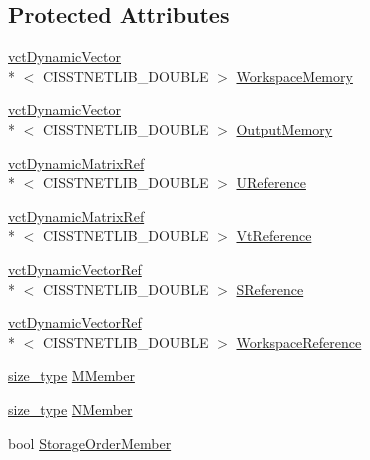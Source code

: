 \subsection*{Protected Attributes}
\begin{DoxyCompactItemize}
\item 
\hyperlink{classvct_dynamic_vector}{vct\-Dynamic\-Vector}\\*
$<$ C\-I\-S\-S\-T\-N\-E\-T\-L\-I\-B\-\_\-\-D\-O\-U\-B\-L\-E $>$ \hyperlink{classnmr_s_v_d_dynamic_data_abe50251589c5f7d24ae6d2024f7344f0}{Workspace\-Memory}
\item 
\hyperlink{classvct_dynamic_vector}{vct\-Dynamic\-Vector}\\*
$<$ C\-I\-S\-S\-T\-N\-E\-T\-L\-I\-B\-\_\-\-D\-O\-U\-B\-L\-E $>$ \hyperlink{classnmr_s_v_d_dynamic_data_a62cf889a1182a098e665a73f4985a9ba}{Output\-Memory}
\end{DoxyCompactItemize}
{\bf }\par
\begin{DoxyCompactItemize}
\item 
\hyperlink{classvct_dynamic_matrix_ref}{vct\-Dynamic\-Matrix\-Ref}\\*
$<$ C\-I\-S\-S\-T\-N\-E\-T\-L\-I\-B\-\_\-\-D\-O\-U\-B\-L\-E $>$ \hyperlink{classnmr_s_v_d_dynamic_data_a2f627a078f4bb1bc05c54f2e3269ae2c}{U\-Reference}
\item 
\hyperlink{classvct_dynamic_matrix_ref}{vct\-Dynamic\-Matrix\-Ref}\\*
$<$ C\-I\-S\-S\-T\-N\-E\-T\-L\-I\-B\-\_\-\-D\-O\-U\-B\-L\-E $>$ \hyperlink{classnmr_s_v_d_dynamic_data_a55d8b13fe84f67743291578ce94578b0}{Vt\-Reference}
\item 
\hyperlink{classvct_dynamic_vector_ref}{vct\-Dynamic\-Vector\-Ref}\\*
$<$ C\-I\-S\-S\-T\-N\-E\-T\-L\-I\-B\-\_\-\-D\-O\-U\-B\-L\-E $>$ \hyperlink{classnmr_s_v_d_dynamic_data_a695e21e7e405283b5f16b9285c31d5eb}{S\-Reference}
\item 
\hyperlink{classvct_dynamic_vector_ref}{vct\-Dynamic\-Vector\-Ref}\\*
$<$ C\-I\-S\-S\-T\-N\-E\-T\-L\-I\-B\-\_\-\-D\-O\-U\-B\-L\-E $>$ \hyperlink{classnmr_s_v_d_dynamic_data_a616c1ec08f23128458db53bbfb1fa0b2}{Workspace\-Reference}
\end{DoxyCompactItemize}

{\bf }\par
\begin{DoxyCompactItemize}
\item 
\hyperlink{classnmr_s_v_d_dynamic_data_ae1d183124f1fe39da05af9cea168101d}{size\-\_\-type} \hyperlink{classnmr_s_v_d_dynamic_data_a80e8b2828a7f24b24a6633bf6caa3ad4}{M\-Member}
\item 
\hyperlink{classnmr_s_v_d_dynamic_data_ae1d183124f1fe39da05af9cea168101d}{size\-\_\-type} \hyperlink{classnmr_s_v_d_dynamic_data_a4096b80ce5ddda1a17c49c4565bf33db}{N\-Member}
\item 
bool \hyperlink{classnmr_s_v_d_dynamic_data_ad8bf7fcd150c906b3f7407b5a91fa51b}{Storage\-Order\-Member}
\end{DoxyCompactItemize}

